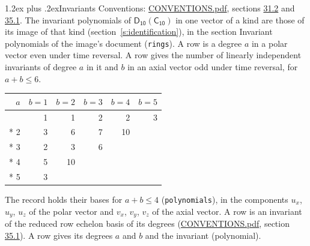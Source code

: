 \documentclass[10pt,a4paper]{article}
\makeatletter
\renewcommand\section{\@startsection{section}{1}{\z@}{-3ex plus -1ex minus -.2ex}%
  {1.2ex plus .2ex}{\normalfont\large\sffamily\bfseries\color{parttitle}}}
\numberwithin{equation}{section}
\newcommand{\grp}[1]{\mathsf{#1}}
\makeatother
\begin{document}
\section{Invariants}\label{s:invariants}
Conventions: \href{../../CONVENTIONS.pdf}{CONVENTIONS.pdf}, sections \href{../../CONVENTIONS.pdf\#conv.31.2}{31.2} and \href{../../CONVENTIONS.pdf\#conv.35.1}{35.1}.
The invariant polynomials of $\grp{D_{10}}(\grp{C_{10}})$ in one vector of a kind are those of its image of that kind (section~\ref{s:identification}), in the section Invariant polynomials of the image's document (\texttt{rings}).
\leavevmode\label{n:index.degree.polar}\label{n:index.degree.axial}A row is a degree $a$ in a polar vector even under time reversal. A row gives the number of linearly independent invariants of degree $a$ in it and $b$ in an axial vector odd under time reversal, for $a + b \le 6$.
{\small\begin{longtable}{@{}rrrrrr@{}}\toprule
$a$ & $b = 1$ & $b = 2$ & $b = 3$ & $b = 4$ & $b = 5$\\\midrule\endhead
\bottomrule\endfoot\endlastfoot
1 & 1 & 1 & 2 & 2 & 3\\*
2 & 3 & 6 & 7 & 10 & \\*
3 & 2 & 3 & 6 &  & \\*
4 & 5 & 10 &  &  & \\*
5 & 3 &  &  &  & \\
\bottomrule\end{longtable}}
\leavevmode\label{n:local.component.polar}\label{n:local.component.axial}The record holds their bases for $a + b \le 4$ (\texttt{polynomials}), in the components $u_{x}$, $u_{y}$, $u_{z}$ of the polar vector and $v_{x}$, $v_{y}$, $v_{z}$ of the axial vector. \label{n:head.polynomial}A row is an invariant of the reduced row echelon basis of its degrees (\href{../../CONVENTIONS.pdf}{CONVENTIONS.pdf}, section \href{../../CONVENTIONS.pdf\#conv.35.1}{35.1}). A row gives its degrees $a$ and $b$ and the invariant (polynomial).
\end{document}
